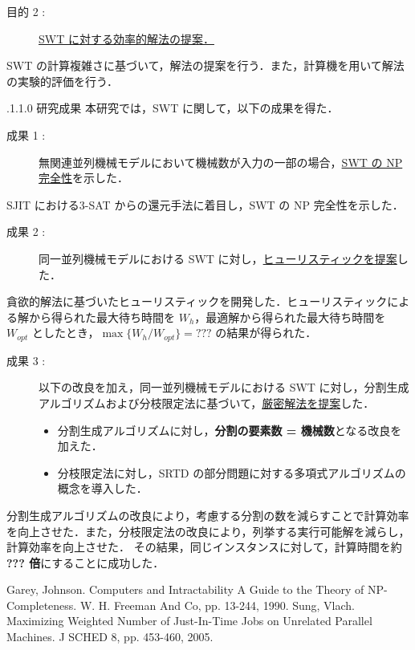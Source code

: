 \documentclass[oneside, 10pt, twocolumn]{jarticle}
\makeatletter
\def\section{\@startsection {section}{1}{\z@}{-3.5ex plus -1ex minus
-.2ex}{2.3 ex plus .2ex}{\large\bf}}
\renewcommand{\section}{
\@startsection{section}{1}{\z@}
{.1\Cvs \@plus.0\Cdp \@minus.1\Cdp}%
{.1\Cvs \@plus.1\Cdp \@minus.0\Cdp}%
{\reset@font\large\bfseries}}      %
\makeatother
\begin{document}
\begin{description}
  \item[目的 2 :]
  \underline{SWT に対する効率的解法の提案．}
\end{description}
SWT の計算複雑さに基づいて，解法の提案を行う．また，計算機を用いて解法の実験的評価を行う．

\section{研究成果}
本研究では，SWT に関して，以下の成果を得た．
\begin{description}
  \item[成果 1 : ]
  無関連並列機械モデルにおいて機械数が入力の一部の場合，\underline{SWT の NP 完全性}を示した．
\end{description}
SJIT における\textsc{3-SAT} からの還元手法に着目し，SWT の NP 完全性を示した．

\begin{description}
  \item[成果 2 : ]
  同一並列機械モデルにおける SWT に対し，\underline{ヒューリスティックを提案}した．
\end{description}
貪欲的解法に基づいたヒューリスティックを開発した．ヒューリスティックによる解から得られた最大待ち時間を $W_h$，最適解から得られた最大待ち時間を $W_{opt}$ としたとき，\mbox{\boldmath $\max\big\{W_h/W_{opt}\big\} = ???$} の結果が得られた．

\begin{description}
  \item[成果 3 : ]
  以下の改良を加え，同一並列機械モデルにおける SWT に対し，分割生成アルゴリズムおよび分枝限定法に基づいて，\underline{厳密解法を提案}した．
  \begin{itemize}
    \setlength{\leftskip}{-10mm}
    \item 分割生成アルゴリズムに対し，{\bf 分割の要素数 = 機械数}となる改良を加えた．
    \item 分枝限定法に対し，SRTD の部分問題に対する多項式アルゴリズムの概念を導入した．
  \end{itemize}
\end{description}
分割生成アルゴリズムの改良により，考慮する分割の数を減らすことで計算効率を向上させた．また，分枝限定法の改良により，列挙する実行可能解を減らし，計算効率を向上させた．
その結果，同じインスタンスに対して，計算時間を約 {\bf ??? 倍}にすることに成功した．

\begin{thebibliography}{9} %
  Garey, Johnson.
  Computers and Intractability A Guide to the Theory of NP-Completeness.
  W. H. Freeman And Co, pp. 13-244, 1990.
  Sung, Vlach.
  Maximizing Weighted Number of Just-In-Time Jobs on Unrelated Parallel Machines. J SCHED 8, pp. 453-460, 2005.
  \vspace{-2mm}
\end{thebibliography}
\end{document}
